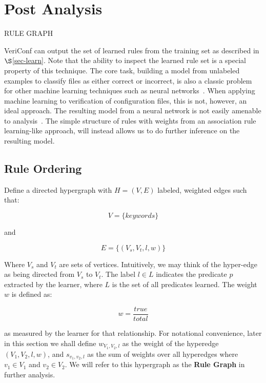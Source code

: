 
\section{Post Analysis}

RULE GRAPH

VeriConf can output the set of learned rules from the training set as described in $\S$\ref{sec-learn}.
Note that the ability to inspect the learned rule set is a special property of this technique.
The core task, building a model from unlabeled examples to classify files as either correct or incorrect, is also a classic problem for other machine learning techniques such as neural networks~\cite{nn1,nn2,nn3}.
When applying machine learning to verification of configuration files, this is not, however, an ideal approach.
The resulting model from a neural network is not easily amenable to analysis~\cite{nnAnalysis1,nnAnalysis2}.
The simple structure of rules with weights from an association rule learning-like approach, will instead allows us to do further inference on the resulting model.

\subsection{Rule Ordering}
\label{sec:ruleorder}

Define a directed hypergraph with $H = (V,E)$ labeled, weighted edges such that:

    $$V = \{ keywords \}$$

and 

    $$E = \{ (V_s, V_t, l, w) \}$$

Where $V_s$ and $V_t$ are sets of vertices. Intuitively, we may think of the
hyper-edge as being directed from $V_s$ to $V_t$. The label $l \in L$ indicates
the predicate $p$ extracted by the learner, where $L$ is the set of all
predicates learned. The weight $w$ is defined as:

    $$w = \frac{true}{total}$$

as measured by the learner for that relationship. For notational
convenience, later in this section
we shall define $w_{V_1, V_2, l}$ as the weight of the
hyperedge $(V_1, V_2, l, w)$, and $s_{v_1, v_2, l}$ as the sum of weights
over all hyperedges where $v_1 \in V_1$ and $v_2 \in V_2$.
We will refer to this hypergraph as the {\bf Rule Graph}
in further analysis.

